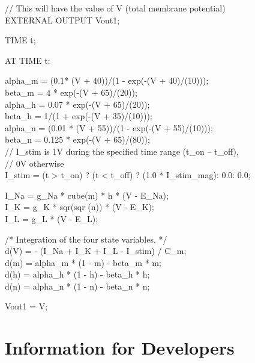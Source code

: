 \begin{maxipage}
\begin{example}

// This will have the value of V (total membrane potential)\\
EXTERNAL OUTPUT Vout1;

TIME t;

AT TIME t:

alpha\_m  = (0.1* (V + 40))/(1 - exp(-(V + 40)/(10)));\\
beta\_m   = 4 * exp(-(V + 65)/(20));\\
alpha\_h  = 0.07 * exp(-(V + 65)/(20));\\
beta\_h   = 1/(1 + exp(-(V + 35)/(10)));\\
alpha\_n  = (0.01 * (V + 55))/(1 - exp(-(V + 55)/(10)));\\
beta\_n   = 0.125 * exp(-(V + 65)/(80));\\

// I\_stim is 1V during the specified time range (t\_on -- t\_off), \\
// 0V otherwise  \\
I\_stim   = (t > t\_on) ? (t < t\_off) ? (1.0 * I\_stim\_mag): 0.0: 0.0;

I\_Na     = g\_Na * cube(m) * h * (V - E\_Na);\\
I\_K 	 = g\_K * sqr(sqr (n)) * (V - E\_K);\\
I\_L	 = g\_L * (V - E\_L);

/* Integration of the four state variables. */\\
d(V) = - (I\_Na + I\_K + I\_L - I\_stim) / C\_m;\\
d(m) = alpha\_m * (1 - m) - beta\_m * m;\\
d(h) = alpha\_h * (1 - h) - beta\_h * h;\\
d(n) = alpha\_n * (1 - n) - beta\_n * n;

Vout1 = V;

\end{example}
\end{maxipage}


\chapter{Information for Developers}





\endinput

